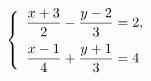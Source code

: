 \begin{ex}
	\begin{condition}
		\( \left\{
		\begin{array}{l}
			\dfrac{x+3}{2}-\dfrac{y-2}{3}=2,\vspace{0,2cm}\\
			\dfrac{x-1}{4}+\dfrac{y+1}{3}=4
		\end{array}
		\right. \)
	\end{condition}
\end{ex}